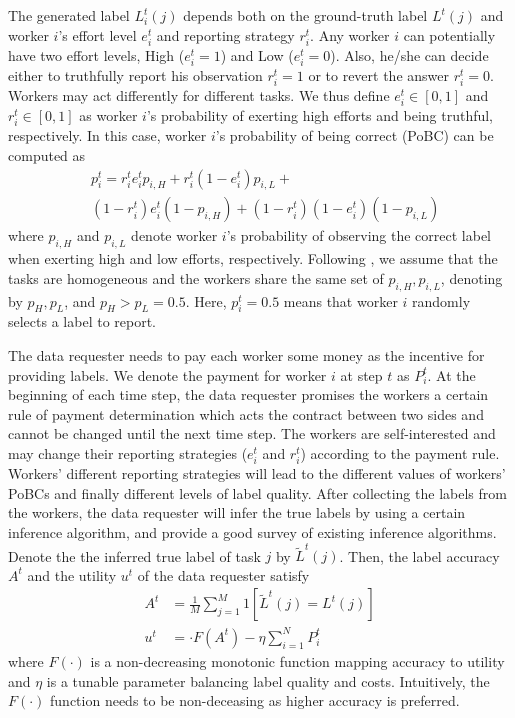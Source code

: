 \documentclass{article}
\begin{document}
The generated label $L^{t}_{i}(j)$ depends both on the ground-truth label $L^{t}(j)$ and worker $i$'s effort level $e^{t}_i$ and reporting strategy $r^{t}_i$.
Any worker $i$ can potentially have two effort levels, High ($e^{t}_i=1$) and Low ($e^{t}_i=0$).
Also, he/she can decide either to truthfully report his observation $r^{t}_i = 1$ or to revert the answer $r^{t}_i = 0$.
Workers may act differently for different tasks. 
We thus define $e^{t}_i\in[0,1]$ and $r^{t}_i\in[0,1]$ as worker $i$'s probability of exerting high efforts and being truthful, respectively.
In this case, worker $i$'s probability of being correct (PoBC) can be computed as
\begin{equation}
\begin{split}
&p^{t}_i=r^{t}_i e^{t}_i p_{i, H}+r^{t}_i (1-e^{t}_i) p_{i, L}+\\
&(1-r^{t}_i) e^{t}_i (1-p_{i, H})+(1-r^{t}_i) (1-e^{t}_i) (1-p_{i, L})
\end{split}
\end{equation}
where $p_{i, H}$ and $p_{i, L}$ denote worker $i$'s probability of observing the correct label when exerting high and low efforts, respectively.
Following \cite{dasgupta2013crowdsourced,liu2017sequential}, we assume that the tasks are homogeneous and the workers share the same set of $p_{i, H}, p_{i, L}$, denoting by $p_H, p_L$, and $p_{H}>p_{L}= 0.5$.
Here, $p^t_i=0.5$ means that worker $i$ randomly selects a label to report.

The data requester needs to pay each worker some money as the incentive for providing labels.
We denote the payment for worker $i$ at step $t$ as $P^{t}_{i}$.
At the beginning of each time step, the data requester promises the workers a certain rule of payment determination which acts the contract between two sides and cannot be changed until the next time step.
The workers are self-interested and may change their reporting strategies ($e^t_i$ and $r^t_i$) according to the payment rule.
Workers' different reporting strategies will lead to the different values of workers' PoBCs and finally different levels of label quality.
After collecting the labels from the workers, the data requester will infer the true labels by using a certain inference algorithm, and \cite{zheng2017truth} provide a good survey of existing inference algorithms.
Denote the the inferred true label of task $j$ by $\tilde{L}^{t}(j)$.
Then, the label accuracy $A^t$ and the utility $u^t$ of the data requester satisfy
\begin{equation}
\label{utility}
\begin{split}
A^t&=\frac{1}{M}{\sum}_{j=1}^{M}1\left[\tilde{L}^{t}(j)=L^{t}(j)\right]\\
u^t &= \cdot F(A^t) - \eta {\sum}_{i=1}^{N}P^t_i
\end{split}
\end{equation}
where $F(\cdot)$ is a non-decreasing monotonic function mapping accuracy to utility and $\eta$ is a
tunable parameter balancing label quality and costs. Intuitively, the $F(\cdot)$ function needs to be non-deceasing as higher accuracy is preferred.
\end{document}

